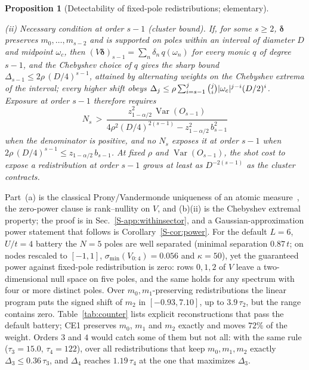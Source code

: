\documentclass[aps,prb,reprint,onecolumn,12pt,superscriptaddress,longbibliography,floatfix]{revtex4-2}
\newtheorem{proposition}{Proposition}
\begin{document}
\begin{proposition}[Detectability of fixed-pole redistributions; elementary]
\begin{enumerate}
\par\emph{(ii) Necessary condition at order $s-1$ (cluster bound).} If, for some $s\ge2$, $\bm{\delta}$ preserves $m_0,\dots,m_{s-2}$ and is supported on poles within an interval of diameter $D$ and midpoint $\omega_c$, then $(V\bm{\delta})_{s-1}=\sum_n\delta_n\,q(\omega_n)$ for every monic $q$ of degree $s-1$, and the Chebyshev choice of $q$ gives the sharp bound $\Delta_{s-1}\le2\rho\,(D/4)^{s-1}$, attained by alternating weights on the Chebyshev extrema of the interval; every higher shift obeys $\Delta_j\le\rho\sum\nolimits_{i=s-1}^{j}\tbinom{j}{i}|\omega_c|^{j-i}(D/2)^{i}$. Exposure at order $s-1$ therefore requires
\begin{equation}
N_s\,>\,\frac{z_{1-\alpha/2}^{2}\,\operatorname{Var}(O_{s-1})}{4\rho^2(D/4)^{2(s-1)}-z_{1-\alpha/2}^2\,b_{s-1}^2}
\label{eq:detect-Ns}
\end{equation}
when the denominator is positive, and no $N_s$ exposes it at order $s-1$ when $2\rho\,(D/4)^{s-1}\le z_{1-\alpha/2}\,b_{s-1}$. At fixed $\rho$ and $\operatorname{Var}(O_{s-1})$, the shot cost to expose a redistribution at order $s-1$ grows at least as $D^{-2(s-1)}$ as the cluster contracts.
\end{enumerate}
\end{proposition}

\noindent Part~(a) is the classical Prony/Vandermonde uniqueness of an atomic measure~\cite{ShohatTamarkin1943,PottsTasche2013}, the zero-power clause is rank--nullity on $V$, and (b)(ii) is the Chebyshev extremal property; the proof is in Sec.~\ref{S-app:withinsector}, and a Gaussian-approximation power statement that follows is Corollary~\ref{S-cor:power}. For the default $L=6$, $U/t=4$ battery the $N=5$ poles are well separated (minimal separation $0.87\,t$; on nodes rescaled to $[-1,1]$, $\sigma_{\min}(V_{0:4})=0.056$ and $\kappa=50$), yet the guaranteed power against fixed-pole redistribution is zero: rows $0,1,2$ of $V$ leave a two-dimensional null space on five poles, and the same holds for any spectrum with four or more distinct poles. Over $m_0,m_1$-preserving redistributions the linear program puts the signed shift of $m_2$ in $[-0.93,7.10]$, up to $3.9\,\tau_2$, but the range contains zero. Table~\ref{tab:counter} lists explicit reconstructions that pass the default battery; CE1 preserves $m_0$, $m_1$ and $m_2$ exactly and moves $72\%$ of the weight. Orders $3$ and $4$ would catch some of them but not all: with the same rule ($\tau_3=15.0$, $\tau_4=122$), over all redistributions that keep $m_0,m_1,m_2$ exactly $\Delta_3\le0.36\,\tau_3$, and $\Delta_4$ reaches $1.19\,\tau_4$ at the one that maximizes $\Delta_3$.
\end{document}

